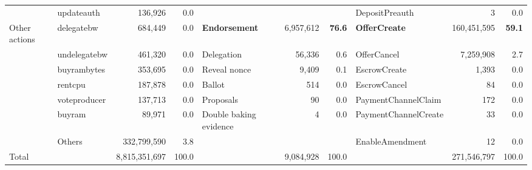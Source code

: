 \begin{table}[htbp]
\begin{tabular}{llrrlrrlrr}
		                & updateauth                         & 136,926                            & 0.0                                 &                        &           &                     & DepositPreauth       & 3           & 0.0                 \\
		\cmidrule(r){1-1} \cmidrule(rl){2-4} \cmidrule(rl){5-7} \cmidrule(l){8-10}
		Other actions   & delegatebw                         & 684,449                            & 0.0                                 & \textbf{Endorsement}   & 6,957,612 & \textbf{     76.6 } & \textbf{OfferCreate} & 160,451,595 & \textbf{     59.1 } \\
		                & undelegatebw                       & 461,320                            & 0.0                                 & Delegation             & 56,336    & 0.6                 & OfferCancel          & 7,259,908   & 2.7                 \\
		                & buyrambytes                        & 353,695                            & 0.0                                 & Reveal nonce           & 9,409     & 0.1                 & EscrowCreate         & 1,393       & 0.0                 \\
		                & rentcpu                            & 187,878                            & 0.0                                 & Ballot                 & 514       & 0.0                 & EscrowCancel         & 84          & 0.0                 \\
		                & voteproducer                       & 137,713                            & 0.0                                 & Proposals              & 90        & 0.0                 & PaymentChannelClaim  & 172         & 0.0                 \\
		                & buyram                             & 89,971                             & 0.0                                 & Double baking evidence & 4         & 0.0                 & PaymentChannelCreate & 33          & 0.0                 \\
		                & Others                             & 332,799,590                        & 3.8                                 &                        &           &                     & EnableAmendment      & 12          & 0.0                 \\
		\midrule
		\midrule
		Total           &                                    & 8,815,351,697                      & 100.0                               &                        & 9,084,928 & 100.0               &                      & 271,546,797 & 100.0               \\
		\bottomrule
	\end{tabular}%
	\label{tab:addlabel}%
\end{table}%




